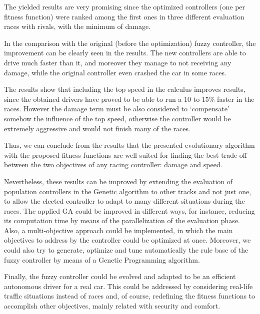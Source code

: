 \documentclass[conference]{IEEEtran}
\begin{document}
The yielded results are very promising since the optimized controllers (one per fitness function) were ranked among the first ones in three different evaluation races with rivals, with the minimum of damage.

In the comparison with the original (before the optimization) fuzzy controller, the improvement can be clearly seen in the results. The new controllers are able to drive much faster than it, and moreover they manage to not receiving any damage, while the original controller even crashed the car in some races.

The results show that including the top speed in the calculus improves
results, since the obtained drivers have proved to be able to run a 10
to 15\% faster in the races. However the damage term must be also
considered to `compensate' somehow the influence of the top speed,
otherwise the controller would be extremely aggressive and would not
finish many of the races.

Thus, we can conclude from the results that the presented evolutionary
algorithm with the
proposed fitness functions are well suited for finding the best
trade-off between the two objectives of any racing controller: damage
and speed. 

Nevertheless, these results can be improved by extending the
evaluation of population controllers in the Genetic algorithm to other
tracks and not just one, to allow the elected controller to adapt to many different situations during the races.
The applied GA could be improved in different ways, for instance, reducing its computation time by means of the parallelization of the evaluation phase.
Also, a multi-objective approach could be implemented, in which the main objectives to address by the controller could be optimized at once.
Moreover, we could also try to generate, optimize and tune automatically the rule base of the fuzzy controller by means of a Genetic Programming algorithm. %

Finally, the fuzzy controller could be evolved and adapted to be an efficient autonomous driver for a real car. This could be addressed by considering real-life traffic situations instead of races and, of course, redefining the fitness functions to accomplish other objectives, mainly related with security and comfort.
\end{document}
